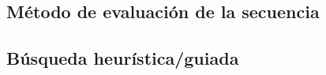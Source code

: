 \subsection{Método de evaluación de la secuencia}











\subsection{Búsqueda heurística/guiada}






